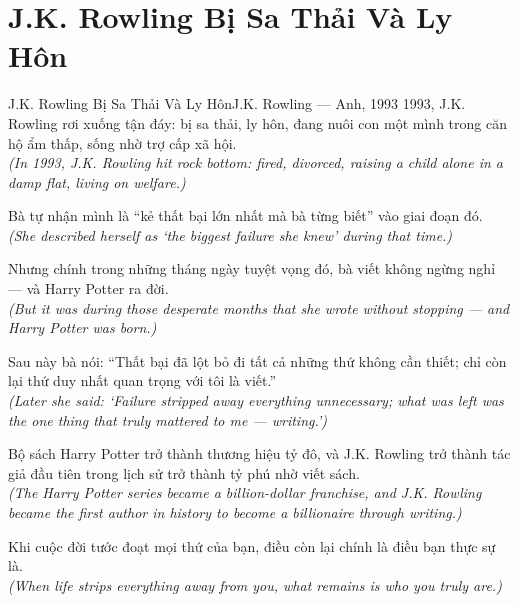 \section{J.K. Rowling Bị Sa Thải Và Ly Hôn}
\begin{truyen}{J.K. Rowling Bị Sa Thải Và Ly Hôn}{J.K. Rowling --- Anh, 1993}
 1993, J.K. Rowling rơi xuống tận đáy: bị sa thải, ly hôn, đang nuôi con một mình trong căn hộ ẩm thấp, sống nhờ trợ cấp xã hội.\\[4pt]
\textit{(In 1993, J.K. Rowling hit rock bottom: fired, divorced, raising a child alone in a damp flat, living on welfare.)}

Bà tự nhận mình là ``kẻ thất bại lớn nhất mà bà từng biết'' vào giai đoạn đó.\\[4pt]
\textit{(She described herself as `the biggest failure she knew' during that time.)}

Nhưng chính trong những tháng ngày tuyệt vọng đó, bà viết không ngừng nghỉ --- và Harry Potter ra đời.\\[4pt]
\textit{(But it was during those desperate months that she wrote without stopping --- and Harry Potter was born.)}

Sau này bà nói: ``Thất bại đã lột bỏ đi tất cả những thứ không cần thiết; chỉ còn lại thứ duy nhất quan trọng với tôi là viết.''\\[4pt]
\textit{(Later she said: `Failure stripped away everything unnecessary; what was left was the one thing that truly mattered to me --- writing.')}

Bộ sách Harry Potter trở thành thương hiệu tỷ đô, và J.K. Rowling trở thành tác giả đầu tiên trong lịch sử trở thành tỷ phú nhờ viết sách.\\[4pt]
\textit{(The Harry Potter series became a billion-dollar franchise, and J.K. Rowling became the first author in history to become a billionaire through writing.)}

\end{truyen}
\begin{baihoc}
  Khi cuộc đời tước đoạt mọi thứ của bạn, điều còn lại chính là điều bạn thực sự là.\\[4pt]
  \textit{(When life strips everything away from you, what remains is who you truly are.)}
\end{baihoc}

